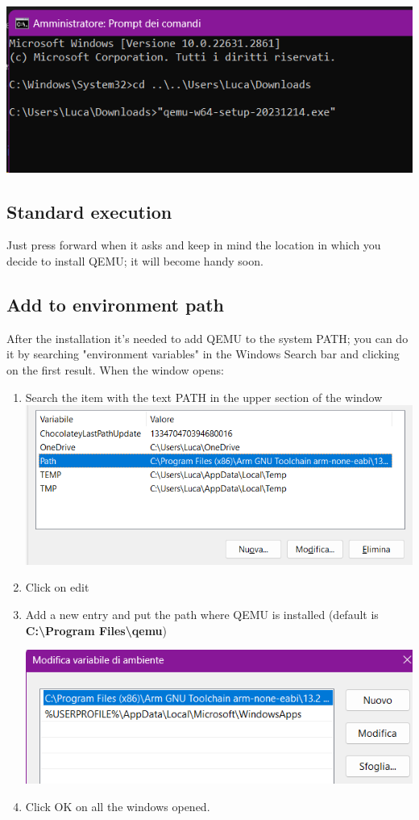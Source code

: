 \documentclass{article}
\begin{document}
\includegraphics[width=\textwidth]{1c}

\subsection{Standard execution}

Just press forward when it asks and keep in mind the location in which you decide to install QEMU; it will become handy soon.

\subsection {Add to environment path}
After the installation it's needed to add QEMU to the system PATH; you can do it by searching "environment variables" in the Windows Search bar and clicking on the first result. When the window opens:

\begin{enumerate}
    \item Search the item with the text PATH in the upper section of the window
    \includegraphics[width=\textwidth]{1d}
    \item Click on edit
    \item Add a new entry and put the path where QEMU is installed (default is \textbf{C:\textbackslash Program Files\textbackslash qemu})

    \includegraphics[width=\textwidth]{1e}
    \item Click OK on all the windows opened.
\end{enumerate}
\end{document}

